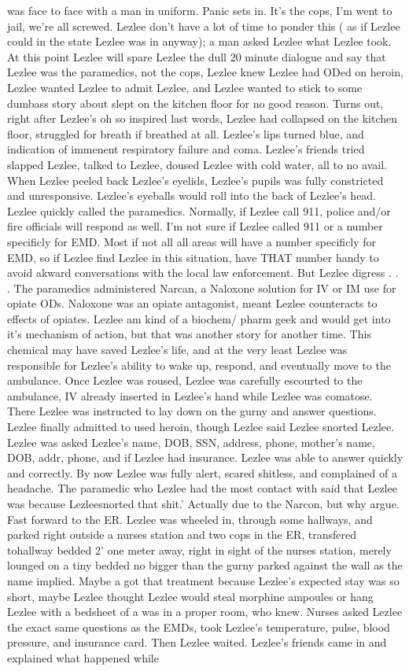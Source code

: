 \documentclass[12pt]{book}
\begin{document}
was face to face with a man in uniform. Panic sets in. It's the cops, I'm went to jail, we're all screwed. Lezlee don't have a lot of time to ponder this ( as if Lezlee could in the state Lezlee was in anyway); a man asked Lezlee what Lezlee took. At this point Lezlee will spare Lezlee the dull 20 minute dialogue and say that Lezlee was the paramedics, not the cops, Lezlee knew Lezlee had ODed on heroin, Lezlee wanted Lezlee to admit Lezlee, and Lezlee wanted to stick to some dumbass story about slept on the kitchen floor for no good reason. Turns out, right after Lezlee's oh so inspired last words, Lezlee had collapsed on the kitchen floor, struggled for breath if breathed at all. Lezlee's lips turned blue, and indication of immenent respiratory failure and coma. Lezlee's friends tried slapped Lezlee, talked to Lezlee, doused Lezlee with cold water, all to no avail. When Lezlee peeled back Lezlee's eyelids, Lezlee's pupils was fully constricted and unresponsive. Lezlee's eyeballs would roll into the back of Lezlee's head. Lezlee quickly called the paramedics. Normally, if Lezlee call 911, police and/or fire officials will respond as well. I'm not sure if Lezlee called 911 or a number specificly for EMD. Most if not all all areas will have a number specificly for EMD, so if Lezlee find Lezlee in this situation, have THAT number handy to avoid akward conversations with the local law enforcement. But Lezlee digress . . .  The paramedics administered Narcan, a Naloxone solution for IV or IM use for opiate ODs. Naloxone was an opiate antagonist, meant Lezlee counteracts to effects of opiates. Lezlee am kind of a biochem/ pharm geek and would get into it's mechanism of action, but that was another story for another time. This chemical may have saved Lezlee's life, and at the very least Lezlee was responsible for Lezlee's ability to wake up, respond, and eventually move to the ambulance. Once Lezlee was roused, Lezlee was carefully escourted to the ambulance, IV already inserted in Lezlee's hand while Lezlee was comatose. There Lezlee was instructed to lay down on the gurny and answer questions. Lezlee finally admitted to used heroin, though Lezlee said Lezlee snorted Lezlee. Lezlee was asked Lezlee's name, DOB, SSN, address, phone, mother's name, DOB, addr, phone, and if Lezlee had insurance. Lezlee was able to answer quickly and correctly. By now Lezlee was fully alert, scared shitless, and complained of a headache. The paramedic who Lezlee had the most contact with said that Lezlee was because Lezleesnorted that shit.' Actually due to the Narcon, but why argue. Fast forward to the ER. Lezlee was wheeled in, through some hallways, and parked right outside a nurses station and two cops in the ER, transfered tohallway bedded 2' one meter away, right in sight of the nurses station, merely lounged on a tiny bedded no bigger than the gurny parked against the wall as the name implied. Maybe a got that treatment because Lezlee's expected stay was so short, maybe Lezlee thought Lezlee would steal morphine ampoules or hang Lezlee with a bedsheet of a was in a proper room, who knew. Nurses asked Lezlee the exact same questions as the EMDs, took Lezlee's temperature, pulse, blood pressure, and insurance card. Then Lezlee waited. Lezlee's friends came in and explained what happened while 
\end{document}
